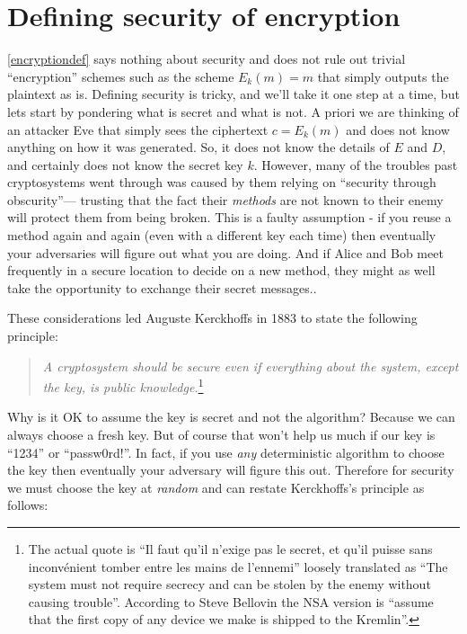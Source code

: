 \section{Defining security of
encryption}\label{1-Defining-security-of-e}

\cref{encryptiondef} says nothing about security and does not rule out
trivial ``encryption'' schemes such as the scheme \(E_k(m) = m\) that
simply outputs the plaintext as is. Defining security is tricky, and
we'll take it one step at a time, but lets start by pondering what is
secret and what is not. A priori we are thinking of an attacker Eve that
simply sees the ciphertext \(c=E_k(m)\) and does not know anything on
how it was generated. So, it does not know the details of \(E\) and
\(D\), and certainly does not know the secret key \(k\). However, many
of the troubles past cryptosystems went through was caused by them
relying on ``security through obscurity''--- trusting that the fact
their \emph{methods} are not known to their enemy will protect them from
being broken. This is a faulty assumption - if you reuse a method again
and again (even with a different key each time) then eventually your
adversaries will figure out what you are doing. And if Alice and Bob
meet frequently in a secure location to decide on a new method, they
might as well take the opportunity to exchange their secret messages..

These considerations led Auguste Kerckhoffs in 1883 to state the
following principle:

\begin{quote}
\emph{A cryptosystem should be secure even if everything about the
system, except the key, is public knowledge.}\footnote{The actual quote
  is ``Il faut qu'il n'exige pas le secret, et qu'il puisse sans
  inconvénient tomber entre les mains de l'ennemi'' loosely translated
  as ``The system must not require secrecy and can be stolen by the
  enemy without causing trouble''. According to Steve Bellovin the NSA
  version is ``assume that the first copy of any device we make is
  shipped to the Kremlin''.}
\end{quote}

Why is it OK to assume the key is secret and not the algorithm? Because
we can always choose a fresh key. But of course that won't help us much
if our key is ``1234'' or ``passw0rd!''. In fact, if you use \emph{any}
deterministic algorithm to choose the key then eventually your adversary
will figure this out. Therefore for security we must choose the key at
\emph{random} and can restate Kerckhoffs's principle as follows:


